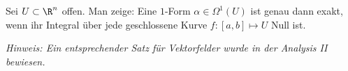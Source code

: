                     \begin{prob}
Sei $U \subset \R^n$ offen. Man zeige: Eine $1$-Form $\alpha\in\Omega^1(U)$ ist genau dann exakt, wenn ihr Integral \"uber jede geschlossene Kurve  $f \colon [a,b] \mapsto U$ Null ist.

{\em Hinweis: Ein entsprechender Satz f\"ur Vektorfelder wurde in der Analysis II bewiesen.}
\vspace{2mm}
                    \end{prob}
